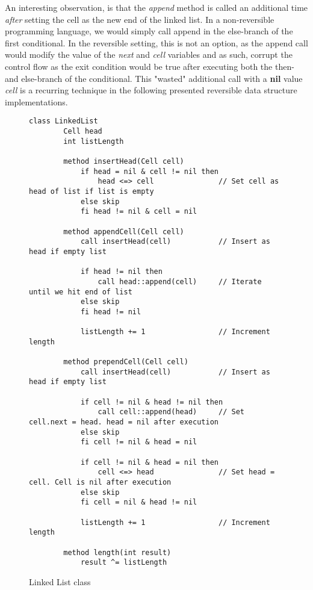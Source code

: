 An interesting observation, is that the \textit{append} method is called an additional time \textit{after} setting the cell as the new end of the linked list. In a non-reversible programming language, we would simply call append in the else-branch of the first conditional. In the reversible setting, this is not an option, as the append call would modify the value of the \textit{next} and \textit{cell} variables and as such, corrupt the control flow as the exit condition would be true after executing both the then- and else-branch of the conditional.
This "wasted" additional call with a \textbf{nil} value \textit{cell} is a recurring technique in the following presented reversible data structure implementations. 

\begin{figure}[ht!]
    \centering
    \begin{lstlisting}[style = basic, language = roopl]                
    class LinkedList
        Cell head
        int listLength
    
        method insertHead(Cell cell)
            if head = nil & cell != nil then
                head <=> cell               // Set cell as head of list if list is empty
            else skip
            fi head != nil & cell = nil
    
        method appendCell(Cell cell)
            call insertHead(cell)           // Insert as head if empty list
    
            if head != nil then
                call head::append(cell)     // Iterate until we hit end of list
            else skip
            fi head != nil
    
            listLength += 1                 // Increment length
    
        method prependCell(Cell cell)
            call insertHead(cell)           // Insert as head if empty list
    
            if cell != nil & head != nil then
                call cell::append(head)     // Set cell.next = head. head = nil after execution
            else skip
            fi cell != nil & head = nil
    
            if cell != nil & head = nil then
                cell <=> head               // Set head = cell. Cell is nil after execution
            else skip
            fi cell = nil & head != nil
    
            listLength += 1                 // Increment length
    
        method length(int result)
            result ^= listLength  
    \end{lstlisting}
    \caption{Linked List class}
    \label{fig:linked-list-class}
\end{figure}


